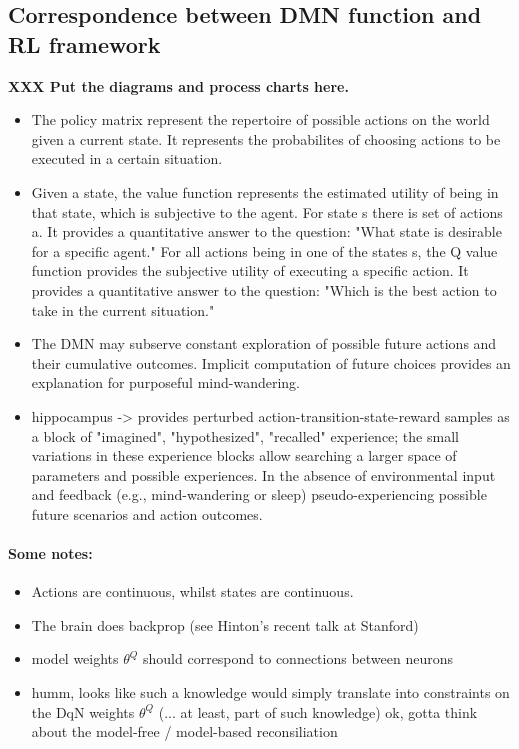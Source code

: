 \documentclass{article} %
\begin{document}
\subsection{Correspondence between DMN function and RL framework}
\textbf{XXX Put the diagrams and process charts here.}
\begin{itemize}
  \item The policy matrix represent the repertoire of possible actions
  on the world given a current state. It represents the probabilites of
  choosing actions to be executed in a certain situation.
  \item Given a state, the value function represents the estimated utility of
  being in that state, which is subjective to the agent. 
  For state s there is set of actions a.
  It provides a quantitative answer to the question:
  "What state is desirable for a specific agent."
  For all actions being in one of the states s,
  the Q value function provides the subjective utility
  of executing a specific action.
  It provides a quantitative answer to the question:
  "Which is the best action to take in the current situation."
  \item The DMN may subserve
  constant exploration of possible future actions and their
  cumulative outcomes. Implicit computation of future choices 
  provides an explanation for purposeful mind-wandering.
  \item hippocampus -> provides perturbed action-transition-state-reward samples
  as a block of "imagined", "hypothesized", "recalled" experience;
  the small variations in these experience blocks allow searching
  a larger space of parameters and possible experiences.
  In the absence of environmental input and feedback
  (e.g., mind-wandering or sleep) pseudo-experiencing possible
  future scenarios and action outcomes.
  
\end{itemize}





\paragraph*{Some notes:}
\begin{itemize}
  \item Actions are continuous, whilst states are continuous.
  \item The brain does backprop (see Hinton's recent talk at Stanford)
  \item model weights $\theta^Q$ should correspond to connections between neurons
\item humm, looks like such a knowledge would simply translate into constraints on the DqN weights $\theta^Q$ (... at least, part of such knowledge)
  ok, gotta think about the model-free / model-based reconsiliation
\end{itemize}
  
\end{document}
